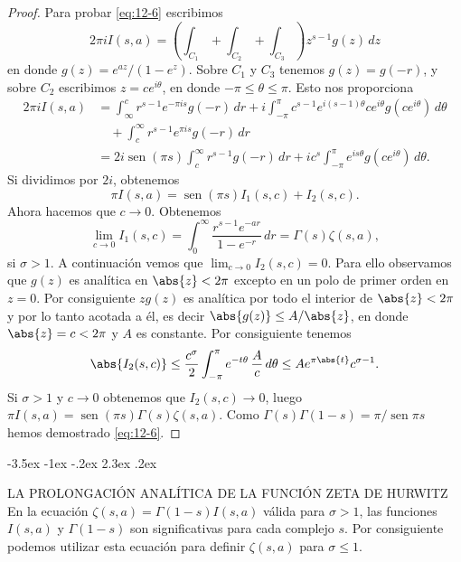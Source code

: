 \documentclass[12pt,a4paper]{book}
\makeatletter
\renewcommand\section{\@startsection{section}{1}{\z@}%
  {-3.5ex \@plus -1ex \@minus -.2ex}%
  {2.3ex \@plus .2ex}%
  {\normalfont\Large\bfseries\raggedright}}
\makeatother
\begin{document}
\begin{proof}
        Para probar \eqref{eq:12-6} escribimos
        \begin{equation*}
            2\pi iI(s,a)=\left(\int_{C_{1}}+\int_{C_{2}}+\int_{C_{3}}\right)z^{s-1}g(z)\,dz
        \end{equation*}
        en donde $g(z)=e^{az}/(1-e^{z})$. Sobre $C_{1}$ y $C_{3}$ tenemos $g(z)=g(-r)$, y sobre
        $C_{2}$ escribimos $z=ce^{i\theta}$, en donde $-\pi\leq\theta\leq\pi$. Esto nos
        proporciona
        \begin{align*}
            2\pi iI(s,a)&=\int_{\infty}^{c}r^{s-1}e^{-\pi is}g(-r)\,dr+i\int_{-\pi}^{\pi}c^{s-1}e^{i(s-1)\theta}ce^{i\theta}g(ce^{i\theta})\,d\theta\\
            &\quad+\int_{c}^{\infty}r^{s-1}e^{\pi is}g(-r)\,dr\\
            &=2i\operatorname{sen}(\pi s)\int_{c}^{\infty}r^{s-1}g(-r)\,dr+ic^{s}\int_{-\pi}^{\pi}e^{is\theta}g(ce^{i\theta})\,d\theta.
        \end{align*}
        Si dividimos por $2i$, obtenemos
        \begin{equation*}
            \pi I(s,a)=\operatorname{sen}(\pi s)I_{1}(s,c)+I_{2}(s,c).
        \end{equation*}
        Ahora hacemos que $c\to0$. Obtenemos
        \begin{equation*}
            \lim_{c\to0}I_{1}(s,c)=\int_{0}^{\infty}\frac{r^{s-1}e^{-ar}}{1-e^{-r}}\,dr=\Gamma(s)\zeta(s,a),
        \end{equation*}
        si $\sigma>1$. A continuación vemos que $\lim_{c\to0}I_{2}(s,c)=0$. Para ello observamos
        que $g(z)$ es analítica en $\abs{z}<2\pi$ excepto en un polo de primer orden en $z=0$.
        Por consiguiente $zg(z)$ es analítica por todo el interior de $\abs{z}<2\pi$ y por lo
        tanto acotada a él, es decir $\abs{g(z)}\leq A/\abs{z}$, en donde $\abs{z}=c<2\pi$ y $A$
        es constante. Por consiguiente tenemos
        \begin{equation*}
            \abs{I_{2}(s,c)}\leq\frac{c^{\sigma}}{2}\int_{-\pi}^{\pi}e^{-t\theta}\,\frac{A}{c}\,d\theta\leq Ae^{\pi\abs{t}}c^{\sigma-1}.
        \end{equation*}
        Si $\sigma>1$ y $c\to0$ obtenemos que $I_{2}(s,c)\to0$, luego
        $\pi I(s,a)=\operatorname{sen}(\pi s)\Gamma(s)\zeta(s,a)$. Como
        $\Gamma(s)\Gamma(1-s)=\pi/\operatorname{sen}\pi s$ hemos demostrado \eqref{eq:12-6}.
    \end{proof}

    \section{LA PROLONGACIÓN ANALÍTICA DE LA FUNCIÓN ZETA DE HURWITZ}
    En la ecuación $\zeta(s,a)=\Gamma(1-s)I(s,a)$ válida para $\sigma>1$, las funciones
    $I(s,a)$ y $\Gamma(1-s)$ son significativas para cada complejo $s$. Por consiguiente
    podemos utilizar esta ecuación para definir $\zeta(s,a)$ para $\sigma\leq1$.
\end{document}

